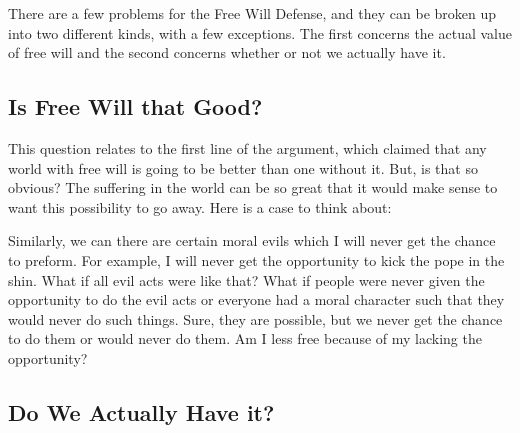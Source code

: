 There are a few problems for the Free Will Defense, and they can be broken up into two different kinds, with a few exceptions. The first concerns the actual value of free will and the second concerns whether or not we actually have it. 

\subsection{Is Free Will that Good?}

This question relates to the first line of the argument, which claimed that any world with free will is going to be better than one without it. But, is that so obvious? The suffering in the world can be so great that it would make sense to want this possibility to go away. Here is a case to think about:


Similarly, we can there are certain moral evils which I will never get the chance to preform. For example, I will never get the opportunity to kick the pope in the shin. What if all evil acts were like that? What if people were never given the opportunity to do the evil acts or everyone had a moral character such that they would never do such things. Sure, they are possible, but we never get the chance to do them or would never do them. Am I less free because of my lacking the opportunity?

\subsection{Do We Actually Have it?}


